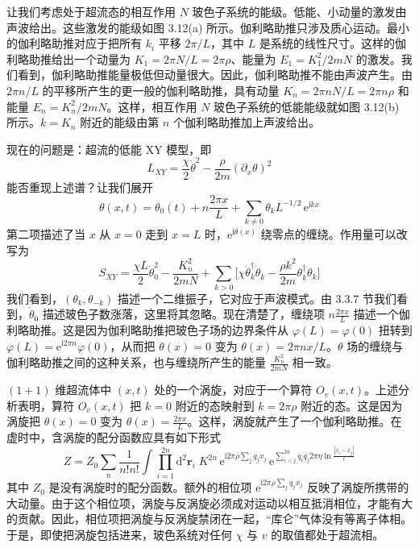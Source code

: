 让我们考虑处于超流态的相互作用 $N$ 玻色子系统的能级。低能、小动量的激发由声波给出。这些激发的能级如图 3.12(a) 所示。伽利略助推只涉及质心运动。最小的伽利略助推对应于把所有 $k_i$ 平移 $2\pi/L$，其中 $L$ 是系统的线性尺寸。这样的伽利略助推给出一个动量为 $K_1 = 2\pi N/L = 2\pi\rho$、能量为 $E_1 = K_1^2/2mN$ 的激发。我们看到，伽利略助推能量极低但动量很大。因此，伽利略助推不能由声波产生。由 $2\pi n/L$ 的平移所产生的更一般的伽利略助推，具有动量 $K_n = 2\pi nN/L = 2\pi n\rho$ 和能量 $E_n = K_n^2/2mN$。这样，相互作用 $N$ 玻色子系统的低能能级就如图 3.12(b) 所示。$k = K_n$ 附近的能级由第 $n$ 个伽利略助推加上声波给出。


现在的问题是：超流的低能 XY 模型，即
\begin{equation*}
L_{XY} = \frac{\chi}{2}\dot{\theta}^2 - \frac{\rho}{2m}(\partial_x\theta)^2\tag{3.6.1}
\end{equation*}
能否重现上述谱？让我们展开
\begin{equation*}
\theta(x,t) = \theta_0(t) + n\frac{2\pi x}{L} + \sum_{k\neq 0}\theta_k L^{-1/2}\,\mathrm{e}^{\mathrm{i}kx}
\end{equation*}
第二项描述了当 $x$ 从 $x = 0$ 走到 $x = L$ 时，$\mathrm{e}^{\mathrm{i}\theta(x)}$ 绕零点的缠绕。作用量可以改写为
\begin{equation*}
S_{XY} = \frac{\chi L}{2}\dot{\theta}_0^2 - \frac{K_n^2}{2mN} + \sum_{k>0}\Big[\chi\dot{\theta}_k^\dagger\dot{\theta}_k - \frac{\rho k^2}{2m}\theta_k^\dagger\theta_k\Big]
\end{equation*}
我们看到，$(\theta_k,\theta_{-k})$ 描述一个二维振子，它对应于声波模式。由 3.3.7 节我们看到，$\dot{\theta}_0$ 描述玻色子数涨落，这里将其忽略。现在清楚了，缠绕项 $n\frac{2\pi x}{L}$ 描述一个伽利略助推。这是因为伽利略助推把玻色子场的边界条件从 $\varphi(L) = \varphi(0)$ 扭转到 $\varphi(L) = \mathrm{e}^{\mathrm{i}2\pi n}\varphi(0)$，从而把 $\theta(x) = 0$ 变为 $\theta(x) = 2\pi nx/L$。$\theta$ 场的缠绕与伽利略助推之间的这种关系，也与缠绕所产生的能量 $\frac{K_n^2}{2mN}$ 相一致。

$(1+1)$ 维超流体中 $(x,t)$ 处的一个涡旋，对应于一个算符 $O_v(x,t)$。上述分析表明，算符 $O_v(x,t)$ 把 $k = 0$ 附近的态映射到 $k = 2\pi\rho$ 附近的态。这是因为涡旋把 $\theta(x) = 0$ 变为 $\theta(x) = \frac{2\pi x}{L}$。这样，涡旋就产生了一个伽利略助推。在虚时中，含涡旋的配分函数应具有如下形式
\begin{equation*}
Z = Z_0\sum_n \frac{1}{n!n!}\int\prod_{i=1}^{2n}\mathrm{d}^2\pmb{r}_i\;K^{2n}\,\mathrm{e}^{\mathrm{i}2\pi\rho\sum_j q_j x_j}\,\mathrm{e}^{\sum_{i<j}^{2n} q_iq_j 2\pi\eta\ln\frac{|x_i - x_j|}{l}}
\end{equation*}
其中 $Z_0$ 是没有涡旋时的配分函数。额外的相位项 $\mathrm{e}^{\mathrm{i}2\pi\rho\sum_j q_j x_j}$ 反映了涡旋所携带的大动量。由于这个相位项，涡旋与反涡旋必须成对运动以相互抵消相位，才能有大的贡献。因此，相位项把涡旋与反涡旋禁闭在一起，“库仑”气体没有等离子体相。于是，即使把涡旋包括进来，玻色系统对任何 $\chi$ 与 $v$ 的取值都处于超流相。

